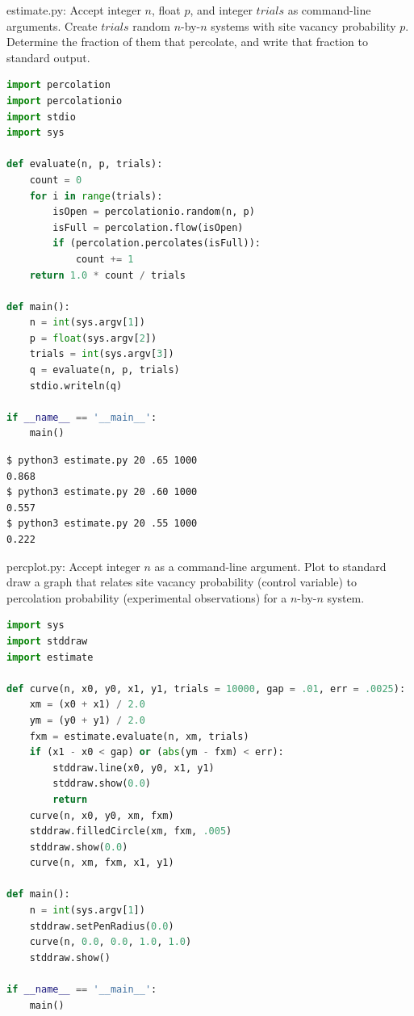 \documentclass[8pt,a4paper,compress]{beamer}
\begin{document}
\begin{frame}[fragile]
\pause

\begin{framed}
\tiny estimate.py: Accept integer $n$, float $p$, and integer $trials$ as command-line arguments. Create $trials$ random $n$-by-$n$ systems with site vacancy probability $p$. Determine the fraction of them that percolate, and
write that fraction to standard output.
\end{framed}

\begin{lstlisting}[language=Python]
import percolation
import percolationio
import stdio
import sys

def evaluate(n, p, trials):
    count = 0
    for i in range(trials):
        isOpen = percolationio.random(n, p)
        isFull = percolation.flow(isOpen)
        if (percolation.percolates(isFull)):
            count += 1
    return 1.0 * count / trials

def main():
    n = int(sys.argv[1])
    p = float(sys.argv[2])
    trials = int(sys.argv[3])
    q = evaluate(n, p, trials)
    stdio.writeln(q)

if __name__ == '__main__':
    main()
\end{lstlisting}

\pause

\begin{lstlisting}[language={}]
$ python3 estimate.py 20 .65 1000
0.868
$ python3 estimate.py 20 .60 1000
0.557
$ python3 estimate.py 20 .55 1000
0.222
\end{lstlisting}
\end{frame}

\begin{frame}[fragile]
\pause

\begin{framed}
\tiny percplot.py:  Accept integer $n$ as a command-line argument. Plot to standard draw a graph that relates site vacancy probability (control variable) to percolation probability (experimental observations) for a $n$-by-$n$ system.
\end{framed}

\begin{lstlisting}[language=Python]
import sys
import stddraw
import estimate

def curve(n, x0, y0, x1, y1, trials = 10000, gap = .01, err = .0025):
    xm = (x0 + x1) / 2.0
    ym = (y0 + y1) / 2.0
    fxm = estimate.evaluate(n, xm, trials)
    if (x1 - x0 < gap) or (abs(ym - fxm) < err):
        stddraw.line(x0, y0, x1, y1)
        stddraw.show(0.0)
        return
    curve(n, x0, y0, xm, fxm)
    stddraw.filledCircle(xm, fxm, .005)
    stddraw.show(0.0)
    curve(n, xm, fxm, x1, y1)
    
def main():
    n = int(sys.argv[1])
    stddraw.setPenRadius(0.0)
    curve(n, 0.0, 0.0, 1.0, 1.0)
    stddraw.show()
    
if __name__ == '__main__':
    main()    
\end{lstlisting}
\end{frame}
\end{document}
